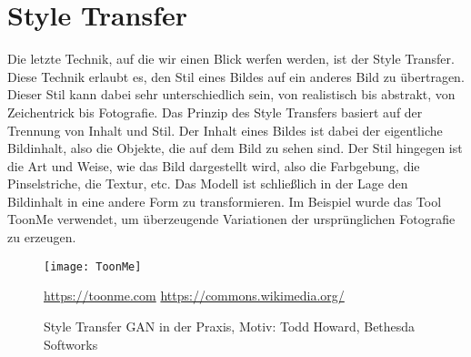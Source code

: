 \section{Style Transfer}

\noindent Die letzte Technik, auf die wir einen Blick werfen werden, ist der Style Transfer. Diese Technik erlaubt es, den Stil eines Bildes auf ein anderes Bild zu übertragen. Dieser Stil kann dabei sehr unterschiedlich sein, von realistisch bis abstrakt, von Zeichentrick bis Fotografie. Das Prinzip des Style Transfers basiert auf der Trennung von Inhalt und Stil. Der Inhalt eines Bildes ist dabei der eigentliche Bildinhalt, also die Objekte, die auf dem Bild zu sehen sind. Der Stil hingegen ist die Art und Weise, wie das Bild dargestellt wird, also die Farbgebung, die Pinselstriche, die Textur, etc. Das Modell ist schließlich in der Lage den Bildinhalt in eine andere Form zu transformieren. Im Beispiel wurde das Tool ToonMe verwendet, um überzeugende Variationen der ursprünglichen Fotografie zu erzeugen.\\

\begin{figure}[H]
    \centering
    \texttt{[image: ToonMe]}
    \caption{Style Transfer GAN in der Praxis, Motiv: Todd Howard, Bethesda Softworks} \quelle\url{https://toonme.com} \quelle\url{https://commons.wikimedia.org/}
\label{fig:deep_learning}
\end{figure}

\newpage
